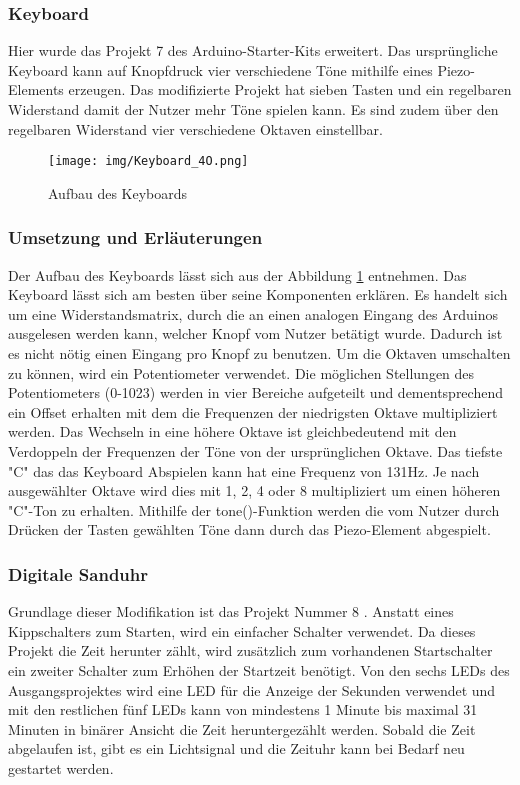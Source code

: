 \subsubsection{Keyboard}
Hier wurde das Projekt 7 des Arduino-Starter-Kits erweitert. Das ursprüngliche Keyboard kann auf Knopfdruck vier verschiedene Töne mithilfe eines Piezo-Elements erzeugen. Das modifizierte Projekt hat sieben Tasten und ein regelbaren Widerstand
damit der Nutzer mehr Töne spielen kann. Es sind zudem über den regelbaren Widerstand vier verschiedene Oktaven einstellbar.

\begin{figure}[h]
\begin{center}
\texttt{[image: img/Keyboard\_4O.png]}
\caption{Aufbau des Keyboards}
\label{kb_aufbau}
\end{center}
\end{figure}

\subsubsection{Umsetzung und Erläuterungen}
Der Aufbau des Keyboards lässt sich aus der Abbildung \ref{kb_aufbau} entnehmen.
Das Keyboard lässt sich am besten über seine Komponenten erklären.
Es handelt sich um eine Widerstandsmatrix, durch die an einen analogen Eingang des Arduinos ausgelesen werden kann,
welcher Knopf vom Nutzer betätigt wurde. Dadurch ist es nicht nötig einen Eingang pro Knopf zu benutzen.
Um die Oktaven umschalten zu können, wird ein Potentiometer verwendet.
Die möglichen Stellungen des Potentiometers (0-1023) werden in vier Bereiche aufgeteilt und 
dementsprechend ein Offset erhalten mit dem die Frequenzen der niedrigsten Oktave multipliziert werden.
Das Wechseln in eine höhere Oktave ist gleichbedeutend mit den Verdoppeln der Frequenzen der Töne von der ursprünglichen Oktave.
Das tiefste "C" das das Keyboard Abspielen kann hat eine Frequenz von 131Hz. Je nach ausgewählter Oktave wird dies mit 1, 2, 4 oder 8 multipliziert um einen höheren "C"-Ton zu erhalten.
Mithilfe der tone()-Funktion werden die vom Nutzer durch Drücken der Tasten gewählten Töne dann durch das Piezo-Element abgespielt.




\subsubsection{Digitale Sanduhr}
Grundlage dieser Modifikation ist das Projekt Nummer 8 \autocite{arduino}. Anstatt eines Kippschalters zum Starten, wird ein einfacher Schalter verwendet. Da dieses Projekt die Zeit herunter zählt, wird zusätzlich zum vorhandenen Startschalter ein zweiter Schalter zum Erhöhen der Startzeit benötigt. Von den sechs LEDs des Ausgangsprojektes wird eine LED für die Anzeige der Sekunden verwendet und mit den restlichen fünf LEDs kann von mindestens 1 Minute bis maximal 31 Minuten in binärer Ansicht die Zeit heruntergezählt werden. Sobald die Zeit abgelaufen ist, gibt es ein Lichtsignal und die Zeituhr kann bei Bedarf neu gestartet werden.

